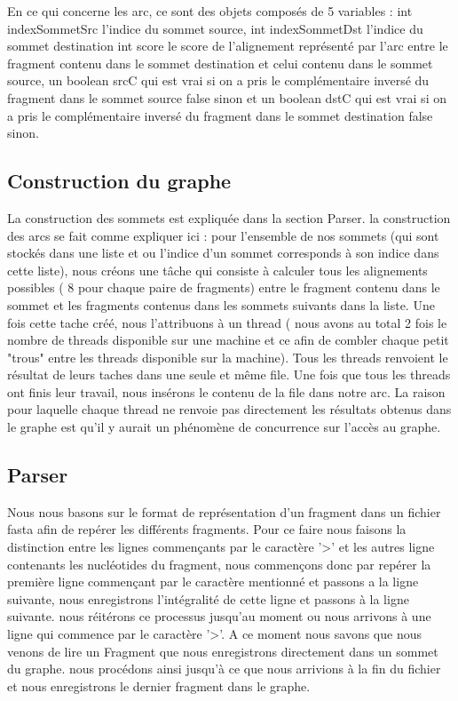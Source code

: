 \documentclass[a4paper]{article}
\begin{document}
En ce qui concerne les arc, ce sont des objets composés de 5 variables : int indexSommetSrc l'indice du sommet source, int indexSommetDst l'indice du sommet destination int score le score de l'alignement représenté par l'arc entre le fragment contenu dans le sommet destination et celui contenu dans le sommet source, un boolean srcC qui est vrai si on a pris le complémentaire inversé du fragment dans le sommet source false sinon et un boolean dstC qui est vrai si on a pris le complémentaire inversé du fragment dans le sommet destination false sinon. 

\subsection{Construction du graphe}
La construction des sommets est expliquée dans la section Parser. 
la construction des arcs se fait comme expliquer ici : pour l'ensemble de nos sommets (qui sont stockés dans une liste et ou l'indice d'un sommet corresponds à son indice dans cette liste), nous créons une tâche qui consiste à calculer tous les alignements possibles ( 8 pour chaque paire de fragments) entre le fragment contenu dans le sommet et les fragments contenus dans les sommets suivants dans la liste. Une fois cette tache créé, nous l'attribuons à un thread ( nous avons au total 2 fois le nombre de threads disponible sur une machine et ce afin de combler chaque petit "trous" entre les threads disponible sur la machine). Tous les threads renvoient le résultat de leurs taches dans une seule et même file. Une fois que tous les threads ont finis leur travail, nous insérons le contenu de la file dans notre arc. La raison pour laquelle chaque thread ne renvoie pas directement les résultats obtenus dans le graphe est qu'il y aurait un phénomène de concurrence sur l'accès au graphe.  


\subsection{Parser}
Nous nous basons sur le format de représentation d'un fragment dans un fichier fasta afin de repérer les différents fragments. Pour ce faire nous faisons la distinction entre les lignes commençants par le caractère '>' et les autres ligne contenants les nucléotides du fragment, nous commençons donc par repérer la première ligne commençant par le caractère mentionné et passons a la ligne suivante, nous enregistrons l'intégralité de cette ligne et passons à la ligne suivante. nous réitérons ce processus jusqu'au moment ou nous arrivons à une ligne qui commence par le caractère '>'. A ce moment nous savons que nous venons de lire un Fragment que nous enregistrons directement dans un sommet du graphe. nous procédons ainsi jusqu'à ce que nous arrivions à la fin du fichier et nous enregistrons le dernier fragment dans le graphe. 
\end{document}
